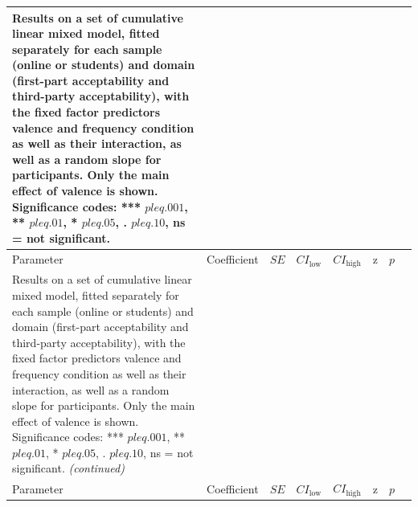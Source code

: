 \documentclass[
]{article}
\begin{document}
\begin{longtable}[t]{lrrrrrrl}
\caption{\label{tab:clmm-raw-effects-of-valency2}Results on a set of cumulative linear mixed model, fitted separately for each sample (online or students) and domain (first-part acceptability and third-party acceptability), with the fixed factor predictors valence and frequency condition as well as their interaction, as well as a random slope for participants. Only the main effect of valence is shown. Significance codes: *** $p \\leq .001$, ** $p \\leq .01$, * $p \\leq .05$, . $p \\leq .10$, ns = not significant.}\\
\toprule
Parameter & Coefficient & $\mathit{SE}$ & $CI_{\text{low}}$ & $CI_{\text{high}}$ & z & $p$ &  \\
\midrule
\endfirsthead
\caption[]{\label{tab:clmm-raw-effects-of-valency2}Results on a set of cumulative linear mixed model, fitted separately for each sample (online or students) and domain (first-part acceptability and third-party acceptability), with the fixed factor predictors valence and frequency condition as well as their interaction, as well as a random slope for participants. Only the main effect of valence is shown. Significance codes: *** $p \\leq .001$, ** $p \\leq .01$, * $p \\leq .05$, . $p \\leq .10$, ns = not significant. \textit{(continued)}}\\
\toprule
Parameter & Coefficient & $\mathit{SE}$ & $CI_{\text{low}}$ & $CI_{\text{high}}$ & z & $p$ &  \\
\midrule
\endhead


\end{longtable}
\end{document}
